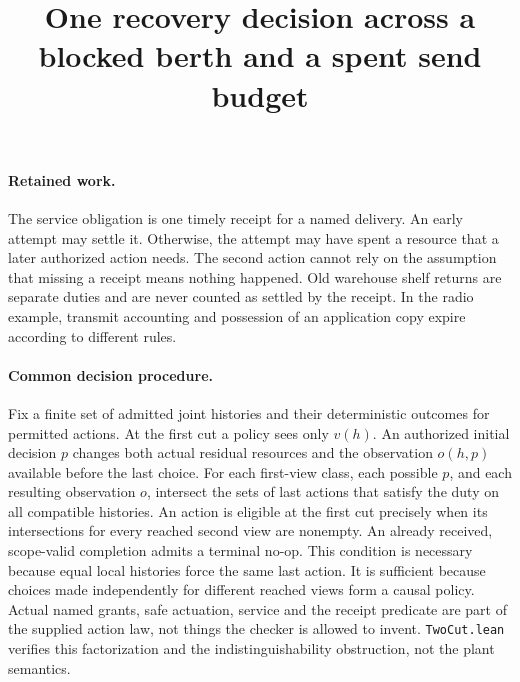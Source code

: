 \documentclass{article}
\title{One recovery decision across a blocked berth and a spent send budget}
\begin{document}
\maketitle
\paragraph{Retained work.}
The service obligation is one timely receipt for a named delivery. An early attempt may settle it. Otherwise, the attempt may have spent a resource that a later authorized action needs. The second action cannot rely on the assumption that missing a receipt means nothing happened. Old warehouse shelf returns are separate duties and are never counted as settled by the receipt. In the radio example, transmit accounting and possession of an application copy expire according to different rules.

\paragraph{Common decision procedure.}
Fix a finite set of admitted joint histories and their deterministic outcomes for permitted actions. At the first cut a policy sees only \(v(h)\). An authorized initial decision \(p\) changes both actual residual resources and the observation \(o(h,p)\) available before the last choice. For each first-view class, each possible \(p\), and each resulting observation \(o\), intersect the sets of last actions that satisfy the duty on all compatible histories. An action is eligible at the first cut precisely when its intersections for every reached second view are nonempty. An already received, scope-valid completion admits a terminal no-op. This condition is necessary because equal local histories force the same last action. It is sufficient because choices made independently for different reached views form a causal policy. Actual named grants, safe actuation, service and the receipt predicate are part of the supplied action law, not things the checker is allowed to invent. \texttt{TwoCut.lean} verifies this factorization and the indistinguishability obstruction, not the plant semantics.
\end{document}
